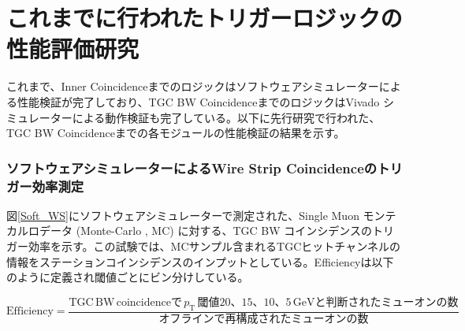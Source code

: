 \section{これまでに行われたトリガーロジックの性能評価研究}
これまで、Inner Coincidenceまでのロジックはソフトウェアシミュレーターによる性能検証が完了しており、TGC BW CoincidenceまでのロジックはVivado シミュレーターによる動作検証も完了している。以下に先行研究で行われた、TGC BW Coincidenceまでの各モジュールの性能検証の結果を示す。

\subsubsection*{ソフトウェアシミュレーターによるWire Strip Coincidenceのトリガー効率測定}
図\ref{Soft_WS}にソフトウェアシミュレーターで測定された、Single Muon モンテカルロデータ (Monte-Carlo , MC) に対する、TGC BW コインシデンスのトリガー効率を示す。この試験では、MCサンプル含まれるTGCヒットチャンネルの情報をステーションコインシデンスのインプットとしている。Efficiencyは以下のように定義され\pt 閾値ごとにビン分けしている。

\begin{equation}
    \mathrm{Efficiency} = \frac{\mathrm{TGC\,BW\,coincidenceで}\,p_{\mathrm{T}}\,閾値20、15、10、5\,\mathrm{GeV}と判断されたミューオンの数}{オフラインで再構成されたミューオンの数}
\end{equation}

